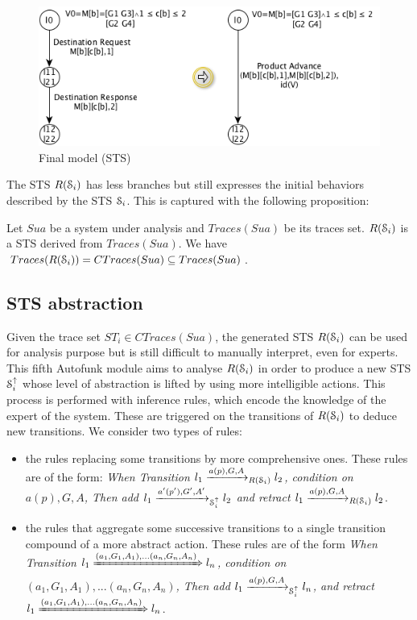 \begin{figure}[ht]
  \includegraphics[width=1.0\linewidth]{figures/STSfinal.png}

	\caption{Final model (STS)}
	\label{fig:finalmodel}
\end{figure}

The STS $R(\EuScript{S}_i)$ has less branches but still expresses
the initial behaviors described by the STS $\EuScript{S}_i$.
This is captured with the following proposition:

\begin{proposition}
  Let $Sua$ be a system under analysis and $Traces(Sua)$ be its traces
  set. $R(\EuScript{S}_i)$ is a STS derived from $Traces(Sua)$.
  We have $Traces(R(\EuScript{S}_i)) = CTraces(Sua) \subseteq Traces(Sua)$.
\end{proposition}

\subsection{STS abstraction}

Given the trace set $ST_i \in CTraces(Sua)$, the generated STS
$R(\EuScript{S}_i)$ can be used for analysis purpose but is still
difficult to manually interpret, even for experts.  This fifth
Autofunk module aims to analyse $R(\EuScript{S}_i)$ in order to
produce a new STS $\EuScript{S}_i^\uparrow$ whose level of
abstraction is lifted by using more intelligible actions. This
process is performed with inference rules, which encode the
knowledge of the expert of the system. These are triggered on the
transitions of $R(\EuScript{S}_i)$ to deduce new transitions. We
consider two types of rules:

\begin{itemize}
    \item the rules replacing some transitions by more
    comprehensive ones. These rules are of the form: \textit{When
    Transition $l_1 \xrightarrow{a(p),G,A}_{R(\EuScript{S}_i)}
    l_2$, condition on $a(p),G,A$, Then add $l_1
    \xrightarrow{a'(p'),G',A'}_{\EuScript{S}_i^\uparrow} l_2$ and
    retract $l_1 \xrightarrow{a(p),G,A}_{R(\EuScript{S}_i)} l_2$}.

    \item the rules that aggregate some successive transitions
    to a single transition compound of a more abstract action.
    These rules are of the form \textit{When Transition $l_1
    \xRightarrow{(a_1,G_1,A_1),...(a_n,G_n,A_n)} l_n$, condition
    on $(a_1,G_1,A_1),...(a_n,G_n,A_n)$, Then add $l_1
    \xrightarrow{a(p),G,A}_{\EuScript{S}_i^\uparrow} l_n $, and
    retract $l_1 \xRightarrow{(a_1,G_1,A_1),...(a_n,G_n,A_n)} l_n$}.
\end{itemize}

